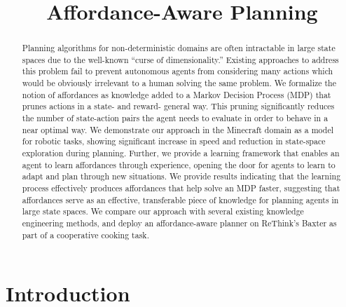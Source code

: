 \documentclass[conference]{IEEEtran}
\begin{document}
\title{Affordance-Aware Planning}

\author{
}

\maketitle

\begin{abstract}
Planning algorithms for non-deterministic domains are often
intractable in large state spaces due to the well-known ``curse of
dimensionality.''  Existing approaches to address this problem fail to prevent autonomous agents
from considering many actions which would be obviously irrelevant to a
human solving the same problem. We formalize the notion of affordances
as knowledge added to a Markov Decision Process (MDP) that prunes actions in a state- and
reward- general way. This pruning significantly reduces the number of
state-action pairs the agent needs to evaluate in order to behave in a near optimal way.
We demonstrate our approach in the Minecraft domain as a
model for robotic tasks, showing significant increase in speed and
reduction in state-space exploration during planning. Further, we
provide a learning framework that enables an agent to learn
affordances through experience, opening the door for agents to learn
to adapt and plan through new situations. We provide
results indicating that the learning process effectively produces
affordances that help solve an MDP faster, suggesting that affordances
serve as an effective, transferable piece of knowledge for planning
agents in large state spaces. We compare our approach with several
existing knowledge engineering methods, and deploy an affordance-aware planner
on ReThink's Baxter as part of a cooperative cooking task.

\end{abstract}

\IEEEpeerreviewmaketitle

\section{Introduction}
\label{sec:introduction}
\end{document}
